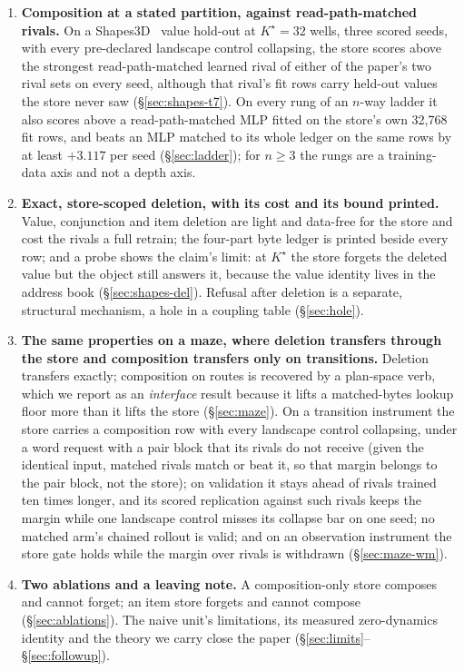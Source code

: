 \documentclass{article} %
\newcommand{\Kstar}{\ensuremath{K^{\star}}}
\begin{document}
\begin{enumerate}[leftmargin=*,itemsep=2pt]
\item \textbf{Composition at a stated partition, against read-path-matched rivals.} On a
  Shapes3D~\citep{burgess2018shapes,kim2018disentangling} value hold-out at $\Kstar=32$ wells, three scored seeds, with every %
  pre-declared landscape control collapsing, the store scores above the strongest read-path-matched
  learned rival of either of the paper's two rival sets on every seed, although that rival's fit rows
  carry held-out values the store never saw (\S\ref{sec:shapes-t7}). On every rung of an $n$-way
  ladder it also scores above a read-path-matched MLP fitted on the store's own 32,768 fit rows, and %
  beats an MLP matched to its whole ledger on the same rows by at least $+3.117$ per seed %
  (\S\ref{sec:ladder}); for $n\ge3$ the rungs are a training-data axis and not a depth axis.
\item \textbf{Exact, store-scoped deletion, with its cost and its bound printed.} Value,
  conjunction and item deletion are light and data-free for the store and cost the rivals a
  full retrain; the four-part byte ledger is printed beside every row; and a probe shows the
  claim's limit: at $\Kstar$ the store forgets the deleted value but the object still answers
  it, because the value identity lives in the address book (\S\ref{sec:shapes-del}).
  Refusal after deletion is a separate, structural mechanism, a hole in a coupling table
  (\S\ref{sec:hole}).
\item \textbf{The same properties on a maze, where deletion transfers through the
  store and composition transfers only on transitions.} Deletion transfers exactly; composition on routes is recovered by a plan-space
  verb, which we report as an \emph{interface} result because it lifts a matched-bytes lookup
  floor more than it lifts the store (\S\ref{sec:maze}). On a transition instrument the store
  carries a composition row with every landscape control collapsing, under a word request with a
  pair block that its rivals do not receive (given the identical input, matched rivals match or
beat it, so that margin belongs to the pair block, not the store); on validation it %
  stays ahead of rivals trained ten times longer, and its scored replication against such rivals
  keeps the margin while one landscape control misses its collapse bar on one seed; no matched
  arm's chained rollout is valid; and on an observation
  instrument the store gate holds while the margin over rivals is withdrawn (\S\ref{sec:maze-wm}).
\item \textbf{Two ablations and a leaving note.} A composition-only store composes and cannot
  forget; an item store forgets and cannot compose (\S\ref{sec:ablations}). The naive unit's
  limitations, its measured zero-dynamics identity and the theory we carry close the paper
  (\S\ref{sec:limits}--\S\ref{sec:followup}).
\end{enumerate}
\end{document}

